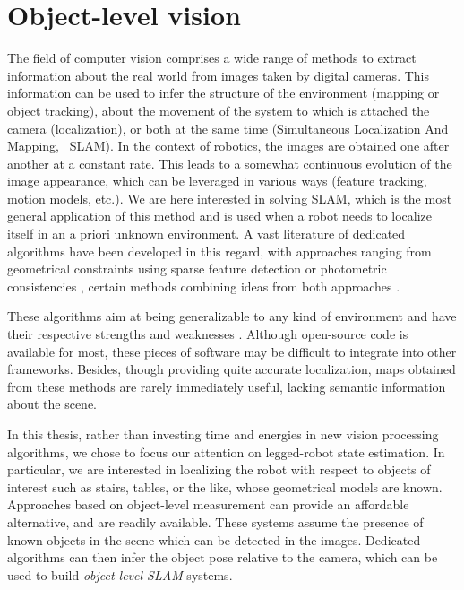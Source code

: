 \chapter{Object-level vision}
\label{chp:object_level}
\minitoc
\bigskip


The field of computer vision comprises a wide range of methods to extract information about the real world from images taken by digital cameras. 
This information can be used to infer the structure of the environment (mapping or object tracking), about the movement of the system to which is 
attached the camera (localization), or both at the same time (Simultaneous Localization And Mapping, \aka\ SLAM). In the context of robotics, the images 
are obtained one after another at a constant rate. This leads to a somewhat continuous evolution of the image appearance, which can be leveraged in 
various ways  (feature tracking, motion models, etc.). We are here interested in solving SLAM, which is the most general application of this method and 
is used when a robot needs to localize itself in an a priori unknown environment. A vast literature of dedicated algorithms have been developed in this 
regard, with approaches ranging from geometrical constraints using sparse feature detection \cite{mur2015orb, ferrera2021ov} or photometric consistencies 
\cite{newcombe2011dtam, engel2014lsd, engel2017direct}, certain methods combining ideas from both approaches \cite{forster2014svo, forster2016svo}.

These algorithms aim at being generalizable to any kind of environment and have their respective strengths and weaknesses \cite{fuentes2015visual}. 
Although open-source code is available for most, these pieces of software may be difficult to integrate into other frameworks. Besides, 
though providing quite accurate localization, maps obtained from these methods are rarely immediately useful, lacking semantic information about 
the scene. 

In this thesis, rather than investing time and energies in new vision processing algorithms, we chose to focus our attention on legged-robot state estimation. 
In particular, we are interested in localizing the robot with respect to objects of interest such as stairs, tables, or the like, whose geometrical models are known.
Approaches based on object-level measurement can provide an affordable alternative, and are readily available. These systems assume the presence of known objects 
in the scene which can be detected in the images. Dedicated algorithms can then infer the object pose relative to the camera, which can be used to build 
\textit{object-level SLAM} systems. 


